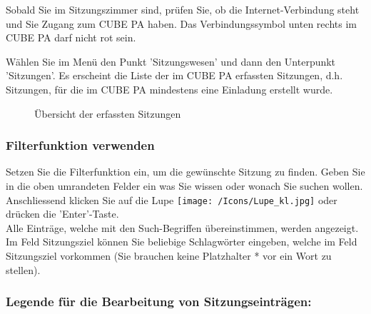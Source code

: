 Sobald Sie im Sitzungszimmer sind, prüfen Sie, ob die Internet-Verbindung steht und Sie Zugang zum CUBE PA haben. Das Verbindungssymbol unten rechts im CUBE PA darf nicht rot sein.

\vspace{\baselineskip}

Wählen Sie im Menü den Punkt 'Sitzungswesen' und dann den Unterpunkt 'Sitzungen'. Es erscheint die Liste der im CUBE PA erfassten Sitzungen, d.h. Sitzungen, für die im CUBE PA mindestens eine Einladung erstellt wurde. 

\begin{figure}[H]
\caption{Übersicht der erfassten Sitzungen}
\end{figure}

\subsubsection{Filterfunktion verwenden}

Setzen Sie die Filterfunktion ein, um die gewünschte Sitzung zu finden. Geben Sie in die oben umrandeten Felder ein was Sie wissen oder wonach Sie suchen wollen. Anschliessend klicken Sie auf die Lupe \texttt{[image: /Icons/Lupe\_kl.jpg]} oder drücken die 'Enter'-Taste.\\

Alle Einträge, welche mit den Such-Begriffen übereinstimmen, werden angezeigt. Im Feld Sitzungsziel können Sie beliebige Schlagwörter eingeben, welche im Feld Sitzungsziel vorkommen (Sie brauchen keine Platzhalter * vor ein Wort zu stellen).

\vspace{\baselineskip}

\pagebreak
\subsubsection{Legende für die Bearbeitung von Sitzungseinträgen:}


